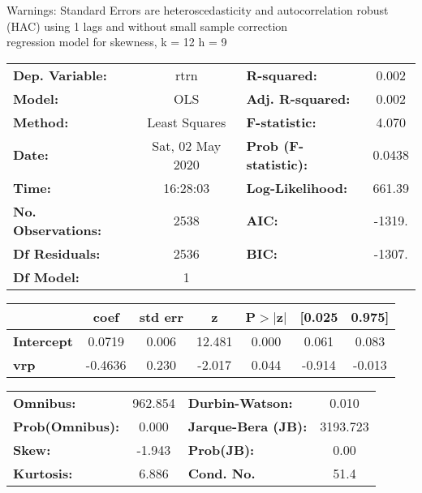 Warnings: \newline
 [1] Standard Errors are heteroscedasticity and autocorrelation robust (HAC) using 1 lags and without small sample correction\\ 

regression model for skewness, k = 12 h = 9\begin{center}
\begin{tabular}{lclc}
\toprule
\textbf{Dep. Variable:}    &       rtrn       & \textbf{  R-squared:         } &     0.002   \\
\textbf{Model:}            &       OLS        & \textbf{  Adj. R-squared:    } &     0.002   \\
\textbf{Method:}           &  Least Squares   & \textbf{  F-statistic:       } &     4.070   \\
\textbf{Date:}             & Sat, 02 May 2020 & \textbf{  Prob (F-statistic):} &   0.0438    \\
\textbf{Time:}             &     16:28:03     & \textbf{  Log-Likelihood:    } &    661.39   \\
\textbf{No. Observations:} &        2538      & \textbf{  AIC:               } &    -1319.   \\
\textbf{Df Residuals:}     &        2536      & \textbf{  BIC:               } &    -1307.   \\
\textbf{Df Model:}         &           1      & \textbf{                     } &             \\
\bottomrule
\end{tabular}
\begin{tabular}{lcccccc}
                   & \textbf{coef} & \textbf{std err} & \textbf{z} & \textbf{P$> |$z$|$} & \textbf{[0.025} & \textbf{0.975]}  \\
\midrule
\textbf{Intercept} &       0.0719  &        0.006     &    12.481  &         0.000        &        0.061    &        0.083     \\
\textbf{vrp}       &      -0.4636  &        0.230     &    -2.017  &         0.044        &       -0.914    &       -0.013     \\
\bottomrule
\end{tabular}
\begin{tabular}{lclc}
\textbf{Omnibus:}       & 962.854 & \textbf{  Durbin-Watson:     } &    0.010  \\
\textbf{Prob(Omnibus):} &   0.000 & \textbf{  Jarque-Bera (JB):  } & 3193.723  \\
\textbf{Skew:}          &  -1.943 & \textbf{  Prob(JB):          } &     0.00  \\
\textbf{Kurtosis:}      &   6.886 & \textbf{  Cond. No.          } &     51.4  \\
\bottomrule
\end{tabular}
\end{center}

